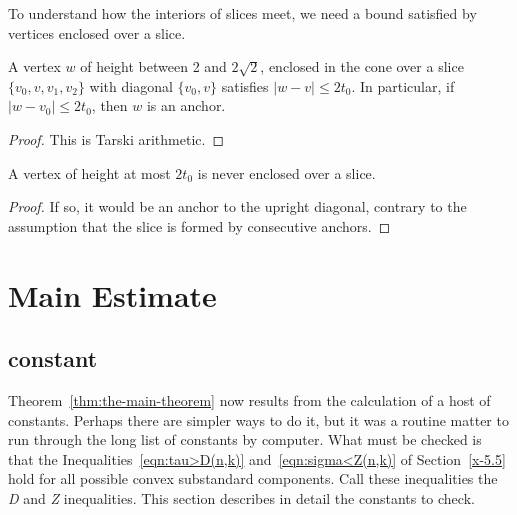 To understand how the interiors of slices meet, we
need a bound satisfied by vertices enclosed over a slice.


\begin{lemma}
    \label{lemma:anc-simplex-not-enc}
A vertex $w$ of height between 2 and $2\sqrt{2}$, enclosed in the cone
over a slice $\{v_0,v,v_1,v_2\}$ with diagonal $\{v_0,v\}$ satisfies
$|w-v|\le 2t_0$. In particular, if $|w-v_0|\le 2t_0$, then $w$ is an anchor.
\end{lemma}

\begin{proof}
This is Tarski arithmetic.
\end{proof}


\begin{corollary}
A vertex of height at most $2t_0$ is never enclosed over a slice.
\end{corollary}

\begin{proof}  If so, it would be an anchor to the upright diagonal, contrary to
the assumption that the slice is formed by consecutive
anchors.
\end{proof}


\section{Main Estimate}

\subsection{constant} %

Theorem~\ref{thm:the-main-theorem} now results from the calculation of a
host of constants. Perhaps there are simpler ways to do it, but it was a
routine matter to run through the long list of constants by computer.
What must be checked is that the Inequalities~\ref{eqn:tau>D(n,k)}
and~\ref{eqn:sigma<Z(n,k)} of Section~\ref{x-5.5} hold for all possible
convex substandard components. Call these inequalities the {\it D} and {\it Z}
inequalities.  This section describes in detail the constants to check.


